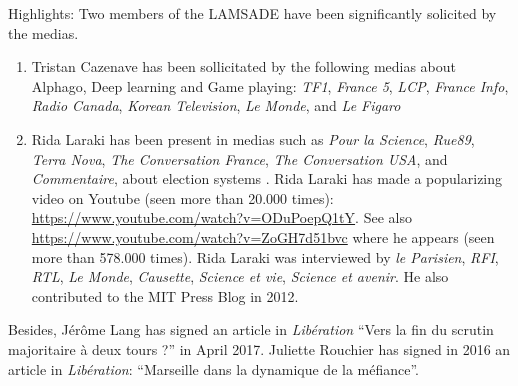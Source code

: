 \documentclass[version=last, pagesize, twoside=semi, DIV=calc, 12pt, a4paper, french, english, bibliography=totoc]{scrartcl}
\begin{document}
Highlights:  Two members of the LAMSADE have been significantly solicited by the medias. 
\begin{enumerate}
\item Tristan Cazenave has been sollicitated by the following medias about Alphago, Deep learning and Game playing:
{\em TF1}, {\em France 5}, {\em LCP}, {\em France Info}, {\em Radio Canada}, {\em Korean Television}, {\em Le Monde}, and {\em Le Figaro}
\item Rida Laraki has been present  in medias such as {\em Pour la Science}, {\em Rue89}, {\em Terra Nova}, {\em The Conversation France}, 
{\em The Conversation USA}, and {\em Commentaire}, about election systems . Rida Laraki  has made a  popularizing video on Youtube (seen more than 20.000 times): \url{https://www.youtube.com/watch?v=ODuPoepQ1tY}. See also \url{https://www.youtube.com/watch?v=ZoGH7d51bvc} where he appears (seen more than 578.000 times). Rida Laraki was interviewed by {\em le Parisien}, {\em RFI}, {\em RTL}, {\em Le Monde}, {\em Causette}, {\em Science et vie}, {\em Science et avenir}. He also contributed to the MIT Press Blog in 2012.  
\end{enumerate}

Besides, J\'er\^ome Lang has signed an article in {\em Lib\'eration} ``Vers la fin du scrutin majoritaire \`a deux tours ?'' in April 2017. 
Juliette Rouchier has signed in 2016 an article in {\em Lib\'eration}: ``Marseille dans la dynamique de la m\'efiance''. 


 
\end{document}
